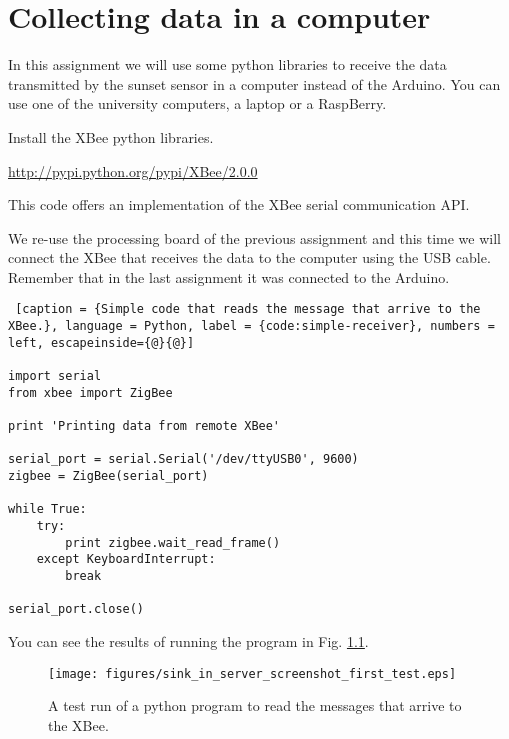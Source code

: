 \chapter{Collecting data in a computer}

In this assignment we will use some python libraries to receive the data transmitted by the sunset sensor in a computer instead of the Arduino.
You can use one of the university computers, a laptop or a RaspBerry.

Install the XBee python libraries.

\url{http://pypi.python.org/pypi/XBee/2.0.0}

This code offers an implementation of the XBee serial communication API.

We re-use the processing board of the previous assignment and this time we will connect the XBee that receives the data to the computer using the USB cable.
Remember that in the last assignment it was connected to the Arduino.

\begin{lstlisting} [caption = {Simple code that reads the message that arrive to the XBee.}, language = Python, label = {code:simple-receiver}, numbers = left, escapeinside={@}{@}]

import serial
from xbee import ZigBee

print 'Printing data from remote XBee'

serial_port = serial.Serial('/dev/ttyUSB0', 9600)
zigbee = ZigBee(serial_port)

while True:
    try:
        print zigbee.wait_read_frame()
    except KeyboardInterrupt:
        break

serial_port.close()
\end{lstlisting}

You can see the results of running the program in Fig. \ref{fig:sink_in_server_screenshot_first_test}.

\begin{figure}[htbp]
  \centering
  \texttt{[image: figures/sink\_in\_server\_screenshot\_first\_test.eps]}
  \caption{A test run of a python program to read the messages that arrive to the XBee.}
  \label{fig:sink_in_server_screenshot_first_test}
\end{figure}


